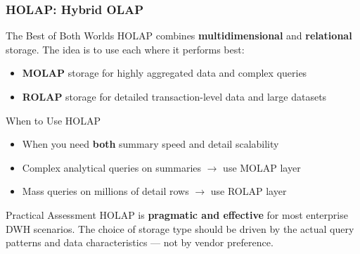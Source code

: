 \begin{frame}
  \frametitle{HOLAP: Hybrid OLAP}

  \begin{block}{The Best of Both Worlds}
    HOLAP combines \textbf{multidimensional} and \textbf{relational} storage.
    The idea is to use each where it performs best:
    \begin{itemize}
      \item \textbf{MOLAP} storage for highly aggregated data and complex queries
      \item \textbf{ROLAP} storage for detailed transaction-level data and large datasets
    \end{itemize}
  \end{block}

  \begin{block}{When to Use HOLAP}
    \begin{itemize}
      \item When you need \textbf{both} summary speed and detail scalability
      \item Complex analytical queries on summaries $\to$ use MOLAP layer
      \item Mass queries on millions of detail rows $\to$ use ROLAP layer
    \end{itemize}
  \end{block}

  \begin{examples}{Practical Assessment}
    HOLAP is \textbf{pragmatic and effective} for most enterprise DWH scenarios.
    The choice of storage type should be driven by the actual query patterns
    and data characteristics --- not by vendor preference.
  \end{examples}
\end{frame}


